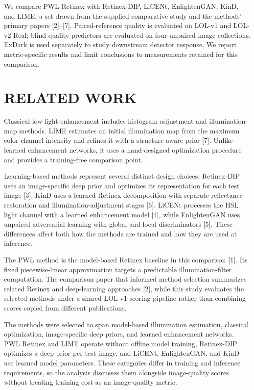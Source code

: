 \documentclass[conference]{IEEEtran}
\begin{document}
We compare PWL Retinex with Retinex-DIP, LiCENt, EnlightenGAN, KinD, and LIME, a set drawn from the supplied comparative study and the methods' primary papers [2]--[7]. Paired-reference quality is evaluated on LOL-v1 and LOL-v2 Real; blind quality predictors are evaluated on four unpaired image collections. ExDark is used separately to study downstream detector response. We report metric-specific results and limit conclusions to measurements retained for this comparison.

\section{RELATED WORK}

Classical low-light enhancement includes histogram adjustment and illumination-map methods. LIME estimates an initial illumination map from the maximum color-channel intensity and refines it with a structure-aware prior [7]. Unlike learned enhancement networks, it uses a hand-designed optimization procedure and provides a training-free comparison point.

Learning-based methods represent several distinct design choices. Retinex-DIP uses an image-specific deep prior and optimizes its representation for each test image [3]. KinD uses a learned Retinex decomposition with separate reflectance-restoration and illumination-adjustment stages [6]. LiCENt processes the HSL light channel with a learned enhancement model [4], while EnlightenGAN uses unpaired adversarial learning with global and local discriminators [5]. These differences affect both how the methods are trained and how they are used at inference.

The PWL method is the model-based Retinex baseline in this comparison [1]. Its fixed piecewise-linear approximation targets a predictable illumination-filter computation. The comparison paper that informed method selection summarizes related Retinex and deep-learning approaches [2], while this study evaluates the selected methods under a shared LOL-v1 scoring pipeline rather than combining scores copied from different publications.

The methods were selected to span model-based illumination estimation, classical optimization, image-specific deep priors, and learned enhancement networks. PWL Retinex and LIME operate without offline model training, Retinex-DIP optimizes a deep prior per test image, and LiCENt, EnlightenGAN, and KinD use learned model parameters. These categories differ in training and inference requirements, so the analysis discusses them alongside image-quality scores without treating training cost as an image-quality metric.
\end{document}
